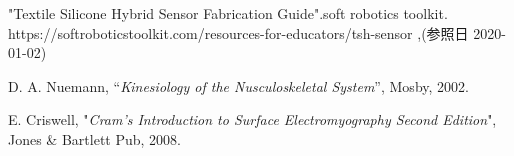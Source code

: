 \pagebreak

\begin{thebibliography}{99}


 "Textile Silicone Hybrid Sensor Fabrication \newline Guide".soft robotics toolkit. \newline https://softroboticstoolkit.com/resources-for-educators/tsh-sensor ,(参照日 2020-01-02)

D. A. Nuemann, ``{\it Kinesiology of the Nusculoskeletal System}'', Mosby, 2002.

E. Criswell, "{\it Cram's Introduction to Surface Electromyography Second Edition}", Jones \& Bartlett Pub, 2008.

\end{thebibliography}
